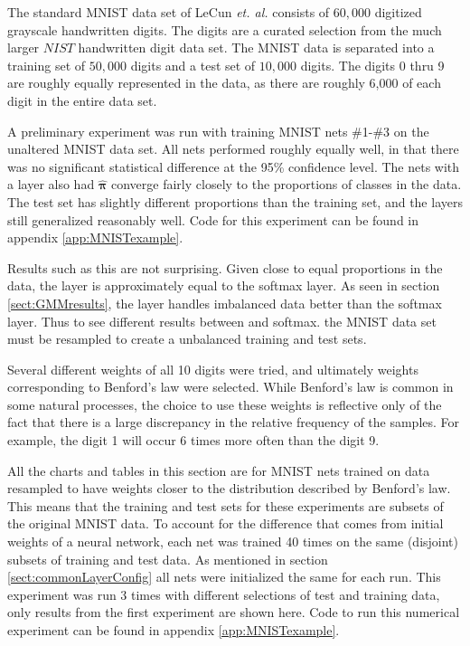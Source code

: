 \label{sect:MNISTresults}
The standard MNIST data set of LeCun \textit{et. al.} \cite{lecun1998gradient} consists of \( 60,000 \) digitized grayscale handwritten digits. The digits are a curated selection from the much larger \( NIST \) handwritten digit data set.  The MNIST data is separated into a training set of \( 50,000 \) digits and a test set of \( 10,000 \) digits.  The digits 0 thru 9 are roughly equally represented in the data, as there are roughly 6,000 of each digit in the entire data set.

A preliminary experiment was run with training MNIST nets \#1-\#3 on the unaltered MNIST data set.  All nets performed roughly equally well, in that there was no significant statistical difference at the 95\% confidence level. The nets with a \RS layer also had \( \hat{\bm \pi} \) converge fairly closely to the proportions of classes in the data.  The test set has slightly different proportions than the training set, and the \RS layers still generalized reasonably well. Code for this experiment can be found in appendix \ref{app:MNISTexample}. 

Results such as this are not surprising. Given close to equal proportions in the data, the \RS layer is approximately equal to the softmax layer. As seen in section \ref{sect:GMMresults}, the \RS layer handles imbalanced data better than the softmax layer. Thus to see different results between \RS and softmax. the MNIST data set must be resampled to create a unbalanced training and test sets.

Several different weights of all 10 digits were tried, and ultimately weights corresponding to Benford's law \cite{benford1938} were selected. While Benford's law is common in some natural processes, the choice to use these weights is reflective only of the fact that there is a large discrepancy in the relative frequency of the samples.  For example, the digit 1 will occur 6 times more often than the digit 9.

All the charts and tables in this section are for MNIST nets trained on data resampled to have weights closer to the distribution described by Benford's law.  This means that the training and test sets for these experiments are subsets of the original MNIST data.  To account for the difference that comes from initial weights of a neural network, each net was trained 40 times on the same (disjoint) subsets of training and test data. As mentioned in section \ref{sect:commonLayerConfig} all nets were initialized the same for each run. This experiment was run 3 times with different selections of test and training data, only results from the first experiment are shown here.  Code to run this numerical experiment can be found in appendix \ref{app:MNISTexample}.

